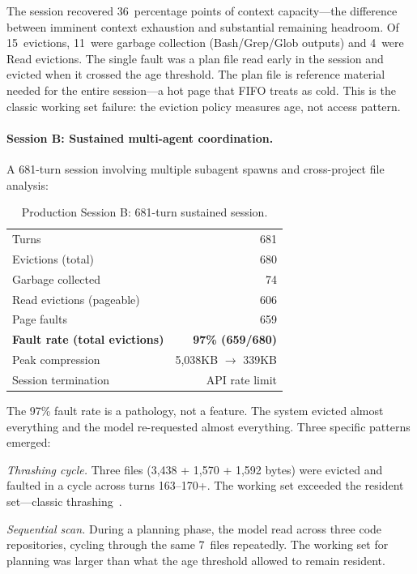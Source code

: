 The session recovered 36~percentage points of context capacity---the
difference between imminent context exhaustion and substantial
remaining headroom. Of 15~evictions, 11~were garbage collection
(Bash/Grep/Glob outputs) and 4~were Read evictions. The single
fault was a plan file read early in the session and evicted when it
crossed the age threshold. The plan file is reference material
needed for the entire session---a hot page that FIFO treats as cold.
This is the classic working set failure: the eviction policy measures
age, not access pattern.

\paragraph{Session B: Sustained multi-agent coordination.}
A 681-turn session involving multiple subagent spawns and
cross-project file analysis:

\begin{table}[ht]
\centering
\caption{Production Session B: 681-turn sustained session.}
\label{tab:session-b}
\small
\begin{tabular}{@{}lr@{}}
\toprule
Turns & 681 \\
Evictions (total) & 680 \\
Garbage collected & 74 \\
Read evictions (pageable) & 606 \\
Page faults & 659 \\
\textbf{Fault rate (total evictions)} & \textbf{97\% (659/680)} \\
Peak compression & 5{,}038KB $\to$ 339KB \\
Session termination & API rate limit \\
\bottomrule
\end{tabular}
\end{table}

The 97\% fault rate is a pathology, not a feature. The system
evicted almost everything and the model re-requested almost
everything. Three specific patterns emerged:

\emph{Thrashing cycle.} Three files (3{,}438 + 1{,}570 + 1{,}592
bytes) were evicted and faulted in a cycle across turns 163--170+.
The working set exceeded the resident set---classic
thrashing~\citep{denning1968working}.

\emph{Sequential scan.} During a planning phase, the model read
across three code repositories, cycling through the same 7~files
repeatedly. The working set for planning was larger than what the
age threshold allowed to remain resident.


